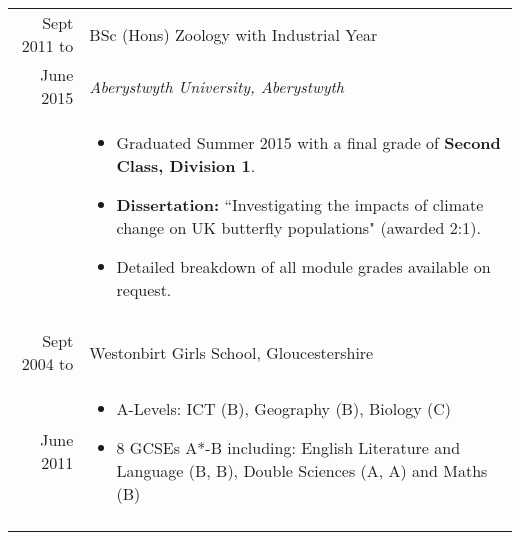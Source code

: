 \documentclass[a4paper, 10pt]{extarticle} %
\begin{document}
\begin{tabular}{r | p{13cm}}	


Sept 2011 to
		
		 & 
		 
		 BSc (Hons) Zoology with Industrial Year \\
		 
			June 2015
		 
		& 
		 
		\textit{Aberystwyth University, Aberystwyth} \\ 
		
& 

\footnotesize{

\vspace{-0.3cm}

\begin{itemize}[leftmargin=*]
\item Graduated Summer 2015 with a final grade of \textbf{Second Class, Division 1}. 

\item \textbf{Dissertation:} ``Investigating the impacts of climate change on UK butterfly populations" (awarded 2:1).

\item Detailed breakdown of all module grades available on request.

\vspace{-0.4cm}

\end{itemize}
} \\

\multicolumn{2}{c}{} \\

Sept 2004 to
		
		 & 
		 
		 Westonbirt Girls School, Gloucestershire  \\
		 
			June 2011
		 
		& 
	
\footnotesize{

\vspace{-0.3cm}

\begin{itemize}[leftmargin=*]
\item A-Levels: ICT (B), Geography (B), Biology (C)

\item 8 GCSEs A*-B including: English Literature and Language (B, B), Double Sciences (A, A) and Maths (B)

\vspace{-0.4cm}

\end{itemize}
} \\

\multicolumn{2}{c}{} 

\end{tabular}
\end{document}
